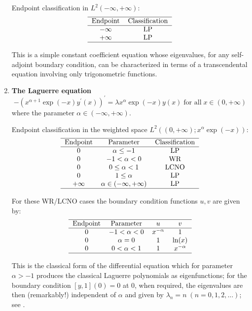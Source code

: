 \documentclass[12pt]{amsart}%
\theoremstyle{plain}
\numberwithin{equation}{section}
\begin{document}
\begin{enumerate}
Endpoint classification in $L^{2}(-\infty,+\infty)$:%
\[%
\begin{tabular}
[c]{cc}\hline
Endpoint & Classification\\\hline
$-\infty$ & LP\\
$+\infty$ & LP\\\hline
\end{tabular}
\]

This is a simple constant coefficient equation whose eigenvalues, for any
self-adjoint boundary condition, can be characterized in terms of a
transcendental equation involving only trigonometric functions.

\item \textbf{The Laguerre equation}%
\[
-(x^{\alpha+1}\exp(-x)y^{\prime}(x))^{\prime}=\lambda x^{\alpha}%
\exp(-x)y(x)\;\text{for all}\;x\in(0,+\infty)
\]
where the parameter $\alpha\in(-\infty,+\infty).$

Endpoint classification in the weighted space $L^{2}((0,+\infty);x^{\alpha
}\exp(-x))$:%
\[%
\begin{tabular}
[c]{ccc}\hline
Endpoint & Parameter & Classification\\\hline
$0$ & $\alpha\leq-1$ & LP\\
$0$ & $-1<\alpha<0$ & WR\\
$0$ & $0\leq\alpha<1$ & LCNO\\
$0$ & $1\leq\alpha$ & LP\\
$+\infty$ & $\alpha\in(-\infty,+\infty)$ & LP\\\hline
\end{tabular}
\]

For these WR/LCNO cases the boundary condition functions $u,v$ are given by:%
\[%
\begin{tabular}
[c]{cccc}\hline
Endpoint & Parameter & $u$ & $v$\\\hline
$0$ & $-1<\alpha<0$ & $x^{-\alpha}$ & $1$\\
$0$ & $\alpha=0$ & $1$ & $\ln(x)$\\
$0$ & $0<\alpha<1$ & $1$ & $x^{-\alpha}$\\\hline
\end{tabular}
\]

This is the classical form of the differential equation which for parameter
$\alpha>-1$ produces the classical Laguerre polynomials as eigenfunctions; for
the boundary condition $[y,1](0)=0$ at $0$, when required, the eigenvalues are
then (remarkably!) independent of $\alpha$ and given by $\lambda
_{n}=n\;(n=0,1,2,...)$; see \cite[Chapter 22, Section 22.6]{AB}.


\end{enumerate}
\end{document}

